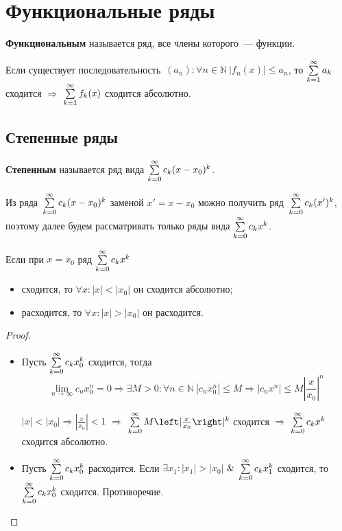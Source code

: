 \section{Функциональные ряды}
 \textbf{Функциональным} называется ряд, все члены которого~--- функции.

\begin{theorem}
Если существует последовательность~$(a_n) \colon \forall n \in \mathbb N \ \allowbreak |f_n(x)| \leqslant a_n$, то $\series a_k$ сходится $\Rightarrow$ $\series f_k(x)$ сходится абсолютно.
\end{theorem}

\subsection{Степенные ряды}
 \textbf{Степенным} называется ряд вида $\series[0] c_k (x - x_0)^k$.

Из ряда~$\series[0] c_k (x - x_0)^k$ заменой $x' = x - x_0$ можно получить ряд~$\series[0] c_k (x')^k$, поэтому далее будем рассматривать только ряды вида $\series[0] c_k x^k$.

\begin{theorem}[Абеля]
Если при $x = x_0$ ряд $\series[0] c_k x^k$
\begin{itemize}
	\item сходится, то $\forall x \colon |x| < |x_0|$ он сходится абсолютно;
	\item расходится, то $\forall x \colon |x| > |x_0|$ он расходится.
\end{itemize}
\end{theorem}
\begin{proof}
\begin{itemize}
	\item Пусть $\series[0] c_k x_0^k$ сходится, тогда
	\begin{equation*}
	\lim_{n \to \infty} c_n x_0^n = 0 \Rightarrow
	\exists M > 0 \colon \forall n \in \mathbb N \ |c_n x_0^n| \leqslant M \Rightarrow
	|c_n x^n| \leqslant M \left| \frac{x}{x_0} \right|^n
	\end{equation*}
	
	$|x| < |x_0| \Rightarrow \left| \frac{x}{x_0} \right| < 1$ $\Rightarrow$ $\series[0] M \left| \frac{x}{x_0} \right|^k$ сходится $\Rightarrow$ $\series[0] c_k x^k$ сходится абсолютно.
	
	\item Пусть $\series[0] c_k x_0^k$ расходится.
	Если $\exists x_1 \colon |x_1| > |x_0|$ $\mathrel{\&}$ $\series[0] c_k x_1^k$ сходится, то $\series[0] c_k x_0^k$ сходится.
	Противоречие.
\end{itemize}
\end{proof}


